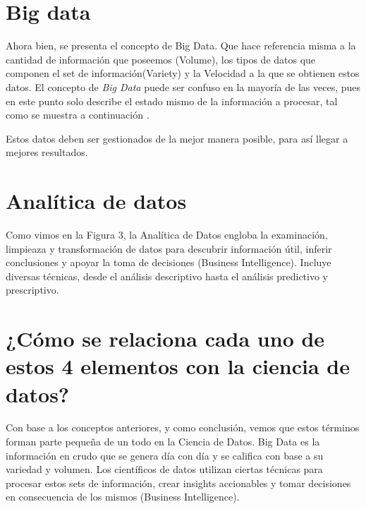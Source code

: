 \documentclass[12pt]{article}
\begin{document}
\begin{figure}[h]
\end{figure}

\section{Big data}
Ahora bien, se presenta el concepto de Big Data. Que hace referencia misma a la cantidad de información que poseemos (Volume), los tipos de datos que componen el set de información(Variety) y la Velocidad a la que se obtienen estos datos. El concepto de \emph{Big Data} puede ser confuso en la mayoría de las veces, pues en este punto solo describe el estado mismo de la información a procesar, tal como se muestra a continuación \cite{1}.\\
\begin{figure}[h]
\end{figure}

Estos datos deben ser gestionados de la mejor manera posible, para así llegar a mejores resultados.

\section{Analítica de datos}
Como vimos en la Figura 3, la Analítica de Datos engloba la examinación, limpieaza y transformación de datos para descubrir información útil, inferir conclusiones y apoyar la toma de decisiones (Business Intelligence)\cite{1}. Incluye diversas técnicas, desde el análisis descriptivo hasta el análisis predictivo y prescriptivo.\\

\section{¿Cómo se relaciona cada uno de estos 4 elementos con la ciencia de datos?}
Con base a los conceptos anteriores, y como conclusión, vemos que estos términos forman parte pequeña de un todo en la Ciencia de Datos. Big Data es la información en crudo que se genera día con día y se califica con base a su variedad y volumen. Los científicos de datos utilizan ciertas técnicas para procesar estos sets de información, crear insights accionables y tomar decisiones en consecuencia de los mismos (Business Intelligence).\\
\end{document}
